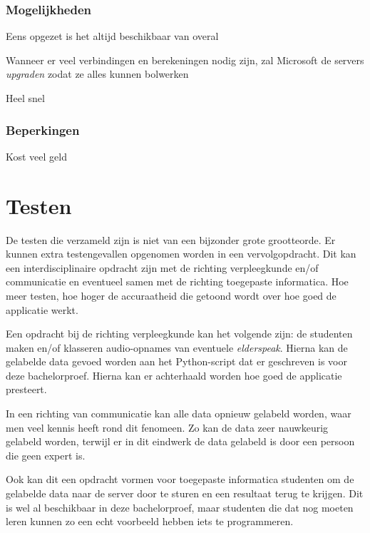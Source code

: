 \subsubsection{Mogelijkheden}
    \item Eens opgezet is het altijd beschikbaar van overal
    \item Wanneer er veel verbindingen en berekeningen nodig zijn, zal Microsoft de servers \textit{upgraden} zodat ze alles kunnen bolwerken
    \item Heel snel
\subsubsection{Beperkingen}
    \item Kost veel geld

\section{Testen}
De testen die verzameld zijn is niet van een bijzonder grote grootteorde. Er kunnen extra testengevallen opgenomen worden in een vervolgopdracht. Dit kan een interdisciplinaire opdracht zijn met de richting verpleegkunde en/of communicatie en eventueel samen met de richting toegepaste informatica. Hoe meer testen, hoe hoger de accuraatheid die getoond wordt over hoe goed de applicatie werkt.

Een opdracht bij de richting verpleegkunde kan het volgende zijn: de studenten maken en/of klasseren audio-opnames van eventuele \textit{elderspeak}. Hierna kan de gelabelde data gevoed worden aan het Python-script dat er geschreven is voor deze bachelorproef. Hierna kan er achterhaald worden hoe goed de applicatie presteert.

In een richting van communicatie kan alle data opnieuw gelabeld worden, waar men veel kennis heeft rond dit fenomeen. Zo kan de data zeer nauwkeurig gelabeld worden, terwijl er in dit eindwerk de data gelabeld is door een persoon die geen expert is.

Ook kan dit een opdracht vormen voor toegepaste informatica studenten om de gelabelde data naar de server door te sturen en een resultaat terug te krijgen. Dit is wel al beschikbaar in deze bachelorproef, maar studenten die dat nog moeten leren kunnen zo een echt voorbeeld hebben iets te programmeren.
